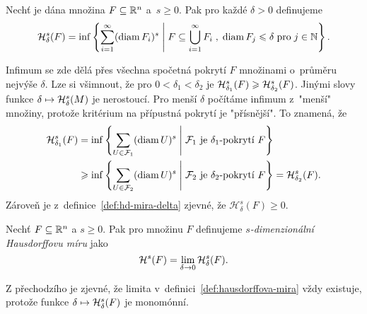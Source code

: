 \begin{definition}\label{def:hd-mira-delta}
    Nechť je dána množina $F\subseteq\R^n$ a~$s\geqslant 0$. Pak pro každé $\delta>0$ definujeme
    \[\hausdorffdeltameasure{s}{\delta}(F)=\inf\set{\sum_{i=1}^{\infty}(\diam{F_i})^s\;\middle|\;F\subseteq\bigcup_{i=1}^\infty F_i\;,\;\diam{F_j}\leqslant\delta\;\text{pro}\;j\in\N}.\]
\end{definition}
Infimum se zde dělá přes všechna spočetná pokrytí $F$ množinami o~průměru nejvýše $\delta$. Lze si všimnout, že pro $0<\delta_1<\delta_2$ je $\hausdorffdeltameasure{s}{\delta_1}(F)\geqslant\hausdorffdeltameasure{s}{\delta_2}(F)$. Jinými slovy funkce $\delta\mapsto\hausdorffdeltameasure{s}{\delta}(M)$ je nerostoucí. Pro menší $\delta$ počítáme infimum z~"menší" množiny, protože kritérium na přípustná pokrytí je "přísnější". To znamená, že
\begin{align*}
    \hausdorffdeltameasure{s}{\delta_1}(F)&=\inf\set{\sum_{U\in\mathcal{F}_1}(\diam{U})^s\;\middle|\;\text{$\mathcal{F}_1$ je $\delta_1$-pokrytí $F$}}\\
    &\geqslant\inf\set{\sum_{U\in\mathcal{F}_2}(\diam{U})^s\;\middle|\;\text{$\mathcal{F}_2$ je $\delta_2$-pokrytí $F$}}=\hausdorffdeltameasure{s}{\delta_2}(F).
\end{align*}
Zároveň je z~definice~\ref{def:hd-mira-delta} zjevné, že $\mathcal{H}_\delta^s(F)\geqslant 0$.
\begin{definition}\label{def:hausdorffova-mira}
    Nechť $F\subseteq\R^n$ a $s\geqslant 0$. Pak pro množinu $F$ definujeme \emph{$s$-dimenzionální Hausdorffovu míru} jako
    \[\hausdorffmeasure{s}(F)=\lim_{\delta\to 0}\hausdorffdeltameasure{s}{\delta}(F).\]
\end{definition}
Z přechodzího je zjevné, že limita v~definici~\ref{def:hausdorffova-mira} vždy existuje, protože funkce $\delta\mapsto\hausdorffdeltameasure{s}{\delta}(F)$ je monomónní.


